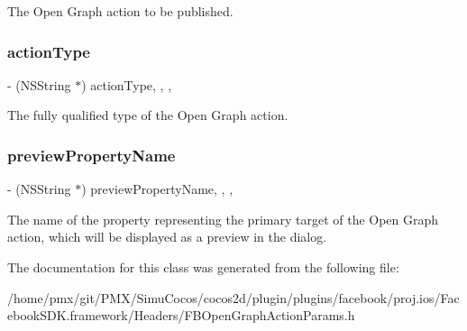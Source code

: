The Open Graph action to be published. \mbox{\label{interfaceFBOpenGraphActionParams_a4db01b3b42d31be87f5cbe38191afabc}} 
\subsubsection{\texorpdfstring{action\+Type}{actionType}}
{\footnotesize\ttfamily -\/ (N\+S\+String $\ast$) action\+Type\hspace{0.3cm}{\ttfamily [read]}, {\ttfamily [write]}, {\ttfamily [nonatomic]}, {\ttfamily [copy]}}

The fully qualified type of the Open Graph action. \mbox{\label{interfaceFBOpenGraphActionParams_ab1174e5a5ec22b2a9866e7cfcccc8550}} 
\subsubsection{\texorpdfstring{preview\+Property\+Name}{previewPropertyName}}
{\footnotesize\ttfamily -\/ (N\+S\+String $\ast$) preview\+Property\+Name\hspace{0.3cm}{\ttfamily [read]}, {\ttfamily [write]}, {\ttfamily [nonatomic]}, {\ttfamily [copy]}}

The name of the property representing the primary target of the Open Graph action, which will be displayed as a preview in the dialog. 

The documentation for this class was generated from the following file\+:\begin{DoxyCompactItemize}
\item 
/home/pmx/git/\+P\+M\+X/\+Simu\+Cocos/cocos2d/plugin/plugins/facebook/proj.\+ios/\+Facebook\+S\+D\+K.\+framework/\+Headers/F\+B\+Open\+Graph\+Action\+Params.\+h\end{DoxyCompactItemize}
